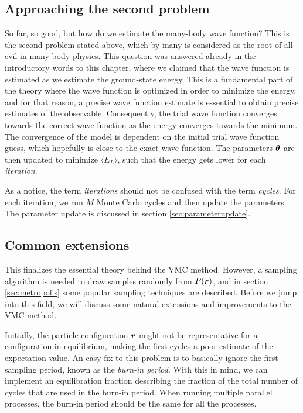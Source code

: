 \subsection{Approaching the second problem}
So far, so good, but how do we estimate the many-body wave function? This is the second problem stated above, which by many is considered as the root of all evil in many-body physics. This question was answered already in the introductory words to this chapter, where we claimed that the wave function is estimated as we estimate the ground-state energy. This is a fundamental part of the theory where the wave function is optimized in order to minimize the energy, and for that reason, a precise wave function estimate is essential to obtain precise estimates of the observable.
Consequently, the trial wave function converges towards the correct wave function as the energy converges towards the minimum. The convergence of the model is dependent on the initial trial wave function guess, which hopefully is close to the exact wave function. The parameters $\boldsymbol{{\theta}}$ are then updated to minimize $\langle E_L\rangle$, such that the energy gets lower for each \textit{iteration}.

As a notice, the term \textit{iterations} should not be confused with the term \textit{cycles}. For each iteration, we run $M$ Monte Carlo cycles and then update the parameters. The parameter update is discussed in section \ref{sec:parameterupdate}.

\subsection{Common extensions}
This finalizes the essential theory behind the VMC method. However, a sampling algorithm is needed to draw samples randomly from $P(\boldsymbol{{r}})$, and in section \ref{sec:metropolis} some popular sampling techniques are described. Before we jump into this field, we will discuss some natural extensions and improvements to the VMC method.

Initially, the particle configuration $\boldsymbol{{r}}$ might not be representative for a configuration in equilibrium, making the first cycles a poor estimate of the expectation value. An easy fix to this problem is to basically ignore the first sampling period, known as the \textit{burn-in period}. With this in mind, we can implement an equilibration fraction describing the fraction of the total number of cycles that are used in the burn-in period. When running multiple parallel processes, the burn-in period should be the same for all the processes.

